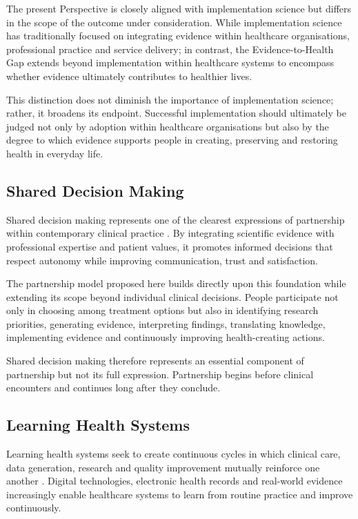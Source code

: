 \documentclass{article}
\begin{document}
The present Perspective is closely aligned with implementation science but differs in the scope of the outcome under consideration. While implementation science has traditionally focused on integrating evidence within healthcare organisations, professional practice and service delivery; in contrast, the Evidence-to-Health Gap extends beyond implementation within healthcare systems to encompass whether evidence ultimately contributes to healthier lives.

This distinction does not diminish the importance of implementation science; rather, it broadens its endpoint. Successful implementation should ultimately be judged not only by adoption within healthcare organisations but also by the degree to which evidence supports people in creating, preserving and restoring health in everyday life.
\subsection{Shared Decision Making}
\label{sec:org8b87e64}

Shared decision making represents one of the clearest expressions of partnership within contemporary clinical practice \cite{Elwyn2012} \cite{Charles1997}. By integrating scientific evidence with professional expertise and patient values, it promotes informed decisions that respect autonomy while improving communication, trust and satisfaction.

The partnership model proposed here builds directly upon this foundation while extending its scope beyond individual clinical decisions. People participate not only in choosing among treatment options but also in identifying research priorities, generating evidence, interpreting findings, translating knowledge, implementing evidence and continuously improving health-creating actions.

Shared decision making therefore represents an essential component of partnership but not its full expression. Partnership begins before clinical encounters and continues long after they conclude.
\subsection{Learning Health Systems}
\label{sec:orgebfa76c}

Learning health systems seek to create continuous cycles in which clinical care, data generation, research and quality improvement mutually reinforce one another \cite{IOM2013}. Digital technologies, electronic health records and real-world evidence \cite{Friedman2017} increasingly enable healthcare systems to learn from routine practice and improve continuously.
\end{document}
